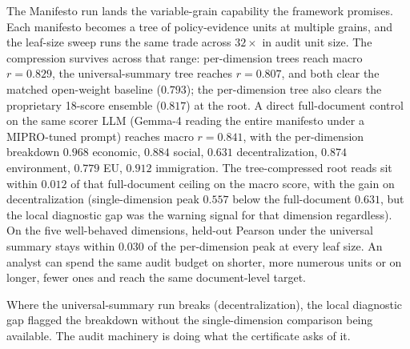 The Manifesto run lands the variable-grain capability the framework
promises. Each manifesto becomes a tree of policy-evidence units at
multiple grains, and the leaf-size sweep runs the same trade
across \(32\times\) in audit unit size. The compression survives
across that range: per-dimension trees reach macro \(r=0.829\), the
universal-summary tree reaches \(r=0.807\), and both clear the
matched open-weight baseline (\(0.793\)); the per-dimension tree
also clears the proprietary 18-score ensemble (\(0.817\)) at the
root. A direct full-document control on the same scorer LLM
(Gemma-4 reading the entire manifesto under a MIPRO-tuned prompt)
reaches macro \(r=0.841\), with the per-dimension breakdown
\(0.968\) economic, \(0.884\) social, \(0.631\) decentralization,
\(0.874\) environment, \(0.779\) EU, \(0.912\) immigration. The
tree-compressed root reads sit within \(0.012\) of that
full-document ceiling on the macro score, with the gain on
decentralization (single-dimension peak \(0.557\) below the
full-document \(0.631\), but the local diagnostic gap was the
warning signal for that dimension regardless). On the five well-behaved dimensions, held-out Pearson under
the universal summary stays within \(0.030\) of the per-dimension
peak at every leaf size. An analyst can spend the same audit budget
on shorter, more numerous units or on longer, fewer ones and reach
the same document-level target.

Where the universal-summary run breaks (decentralization), the
local diagnostic gap flagged the breakdown without the
single-dimension comparison being available. The audit machinery
is doing what the certificate asks of it.

